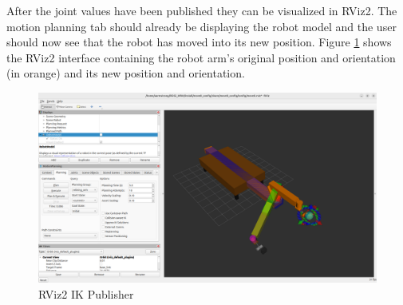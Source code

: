 \documentclass[10pt,a4paper,english]{article}
\begin{document}
After the joint values have been published they can be visualized in RViz2. The motion planning tab should already be displaying the robot model and the user should now see that the robot has moved into its new position. Figure \ref{fig:rviz2_ik_rviz_publisher} shows the RViz2 interface containing the robot arm's original position and orientation (in orange) and its new position and orientation.

\begin{figure}[ht]
    \centering
    \includegraphics[width=1.0\textwidth]{IK_RViz_Publisher.png}
    \caption{RViz2 IK Publisher}
    \label{fig:rviz2_ik_rviz_publisher}
\end{figure}
\newpage

\end{document}
